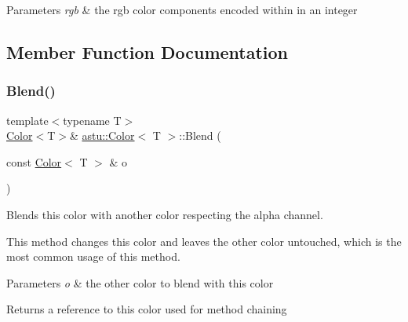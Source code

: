 \begin{DoxyParams}{Parameters}
{\em rgb} & the rgb color components encoded within in an integer \\
\hline
\end{DoxyParams}


\subsection{Member Function Documentation}
\mbox{\label{classastu_1_1Color_a33b9d43c6d2306ccd7e3071e0e52eb25}} 
\subsubsection{\texorpdfstring{Blend()}{Blend()}}
{\footnotesize\ttfamily template$<$typename T$>$ \\
\hyperlink{classastu_1_1Color}{Color}$<$T$>$\& \hyperlink{classastu_1_1Color}{astu\+::\+Color}$<$ T $>$\+::Blend (\begin{DoxyParamCaption}\item[{const \hyperlink{classastu_1_1Color}{Color}$<$ T $>$ \&}]{o }\end{DoxyParamCaption})\hspace{0.3cm}{\ttfamily [inline]}}

Blends this color with another color respecting the alpha channel.

This method changes this color and leaves the other color untouched, which is the most common usage of this method.


\begin{DoxyParams}{Parameters}
{\em o} & the other color to blend with this color \\
\hline
\end{DoxyParams}
\begin{DoxyReturn}{Returns}
a reference to this color used for method chaining 
\end{DoxyReturn}
\mbox{\label{classastu_1_1Color_a02abdb3a0d65626cb6bae8cbad7d6dfd}} 

